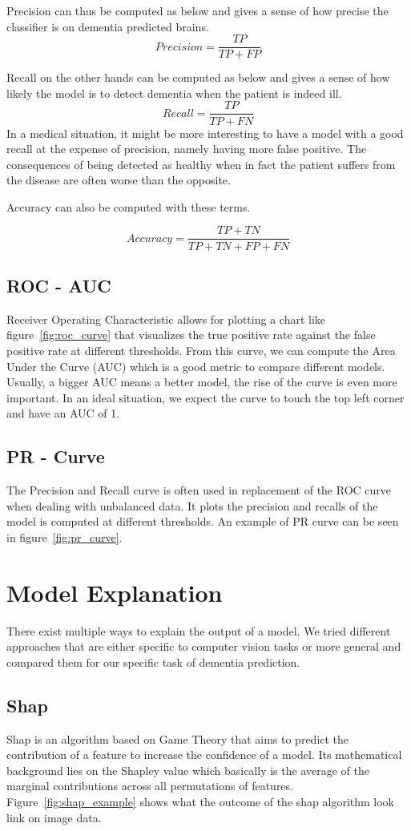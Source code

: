 Precision can thus be computed as below and gives a sense of how precise the classifier is on dementia predicted brains.
$$Precision = \frac{TP}{TP +  FP}$$

Recall on the other hands can be computed as below and gives a sense of how likely the model is to detect dementia when the patient is indeed ill.
$$Recall =\frac{TP}{TP + FN}$$
In a medical situation, it might be more interesting to have a model with a good recall at the expense of precision, namely having more false positive. The consequences of being detected as healthy when in fact the patient suffers from the disease are often worse than the opposite.

Accuracy can also be computed with these terms.


$$Accuracy = \frac{TP + TN}{TP + TN + FP + FN}$$


\subsection{ROC - AUC}
Receiver Operating Characteristic allows for plotting a chart like figure~\ref{fig:roc_curve} that visualizes the true positive rate against the false positive rate at different thresholds. From this curve, we can compute the Area Under the Curve (AUC) which is a good metric to compare different models. Usually, a bigger AUC means a better model, the rise of the curve is even more important.
In an ideal situation, we expect the curve to touch the top left corner and have an AUC of 1.

\subsection{PR - Curve}
The Precision and Recall curve is often used in replacement of the ROC curve when dealing with unbalanced data. It plots the precision and recalls of the model is computed at different thresholds. An example of PR curve can be seen in figure~\ref{fig:pr_curve}.

\section{Model Explanation}
\label{sec:model_explaination}
There exist multiple ways to explain the output of a model. We tried different approaches that are either specific to computer vision tasks or more general and compared them for our specific task of dementia prediction.

\subsection{Shap}
Shap is an algorithm based on Game Theory that aims to predict the contribution of a feature to increase the confidence of a model. Its mathematical background lies on the Shapley value which basically is the average of the marginal contributions across all permutations of features. Figure~\ref{fig:shap_example} shows what the outcome of the shap algorithm look link on image data.

